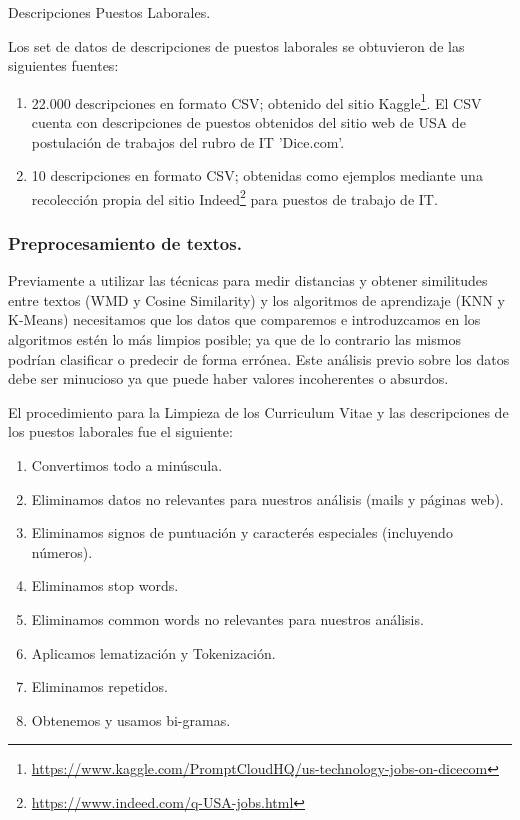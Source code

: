 \documentclass[12pt,a4paper]{article}
\makeatletter
\renewcommand\paragraph{\@startsection{paragraph}{4}{\z@}
            {-2.5ex\@plus -1ex \@minus -.25ex}
            {1.25ex \@plus .25ex}
            {\normalfont\normalsize\bfseries}}
\makeatother
\begin{document}
\begin{sloppypar}
\paragraph{Descripciones Puestos Laborales.}

Los set de datos de descripciones de puestos laborales se obtuvieron de las siguientes fuentes:

\begin{enumerate}
\item 22.000 descripciones en formato CSV; obtenido del sitio Kaggle\footnote{\url{https://www.kaggle.com/PromptCloudHQ/us-technology-jobs-on-dicecom}}. El CSV cuenta con descripciones de puestos obtenidos del sitio web de USA de postulación de trabajos del rubro de IT 'Dice.com'.
\item 10 descripciones en formato CSV; obtenidas como ejemplos mediante una recolección propia del sitio Indeed\footnote{\url{https://www.indeed.com/q-USA-jobs.html}} para puestos de trabajo de IT.
\end{enumerate}

\cleardoublepage

\subsubsection{Preprocesamiento de textos.}
Previamente a utilizar las técnicas para medir distancias y obtener similitudes entre textos (WMD y Cosine Similarity) y los algoritmos de aprendizaje (KNN y K-Means) necesitamos que los datos que comparemos e introduzcamos en los algoritmos estén lo más limpios posible; ya que de lo contrario las mismos podrían clasificar o predecir de forma errónea. Este análisis previo sobre los datos debe ser minucioso ya que puede haber valores incoherentes o absurdos.

El procedimiento para la Limpieza de los Curriculum Vitae y las descripciones de los puestos laborales fue el siguiente:

\begin{enumerate}
\item Convertimos todo a minúscula.
\item Eliminamos datos no relevantes para nuestros análisis (mails y páginas web).
\item Eliminamos signos de puntuación y caracterés especiales (incluyendo números).
\item Eliminamos stop words.
\item Eliminamos common words no relevantes para nuestros análisis.
\item Aplicamos lematización y Tokenización.
\item Eliminamos repetidos.
\item Obtenemos y usamos bi-gramas.
\end{enumerate}


\end{sloppypar}
\end{document}

